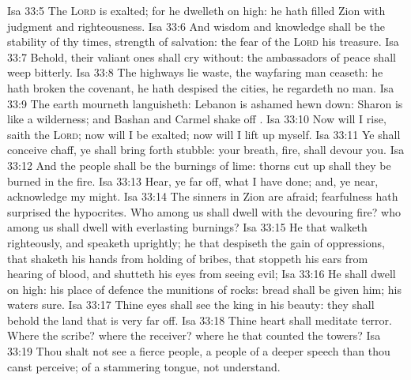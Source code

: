 \vs Isa 33:5 The \textsc{Lord} is exalted; for he dwelleth on high: he hath filled Zion with judgment and righteousness.
\vs Isa 33:6 And wisdom and knowledge shall be the stability of thy times,  strength of salvation: the fear of the \textsc{Lord}  his treasure.
\vs Isa 33:7 Behold, their valiant ones shall cry without: the ambassadors of peace shall weep bitterly.
\vs Isa 33:8 The highways lie waste, the wayfaring man ceaseth: he hath broken the covenant, he hath despised the cities, he regardeth no man.
\vs Isa 33:9 The earth mourneth  languisheth: Lebanon is ashamed  hewn down: Sharon is like a wilderness; and Bashan and Carmel shake off .
\vs Isa 33:10 Now will I rise, saith the \textsc{Lord}; now will I be exalted; now will I lift up myself.
\vs Isa 33:11 Ye shall conceive chaff, ye shall bring forth stubble: your breath,  fire, shall devour you.
\vs Isa 33:12 And the people shall be  the burnings of lime:  thorns cut up shall they be burned in the fire.
\vs Isa 33:13 Hear, ye  far off, what I have done; and, ye  near, acknowledge my might.
\vs Isa 33:14 The sinners in Zion are afraid; fearfulness hath surprised the hypocrites. Who among us shall dwell with the devouring fire? who among us shall dwell with everlasting burnings?
\vs Isa 33:15 He that walketh righteously, and speaketh uprightly; he that despiseth the gain of oppressions, that shaketh his hands from holding of bribes, that stoppeth his ears from hearing of blood, and shutteth his eyes from seeing evil;
\vs Isa 33:16 He shall dwell on high: his place of defence  the munitions of rocks: bread shall be given him; his waters  sure.
\vs Isa 33:17 Thine eyes shall see the king in his beauty: they shall behold the land that is very far off.
\vs Isa 33:18 Thine heart shall meditate terror. Where  the scribe? where  the receiver? where  he that counted the towers?
\vs Isa 33:19 Thou shalt not see a fierce people, a people of a deeper speech than thou canst perceive; of a stammering tongue,  not understand.
